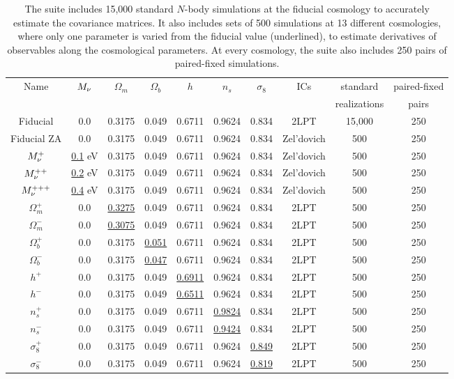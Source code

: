 \begin{table}
\caption{
The \quij suite includes 15,000 standard $N$-body simulations at the fiducial cosmology to 
accurately estimate the covariance matrices. It also includes sets of 500 simulations at 13 
different cosmologies, where only one parameter is varied from the fiducial value (underlined), 
to estimate derivatives of observables along the cosmological parameters. At every cosmology,
the \quij suite also includes 250 pairs of paired-fixed simulations.  
} 
\begin{center}
\begin{tabular}{cccccccccc} \toprule
Name  &$M_\nu$ & $\Omega_m$ & $\Omega_b$ & $h$ & $n_s$ & $\sigma_8$ & ICs & standard & paired-fixed \\
& & & & & & & & realizations & pairs \\[3pt] \hline\hline
Fiducial 	& 0.0         & 0.3175 & 0.049 & 0.6711 & 0.9624 & 0.834 & 2LPT & 15,000 & 250\\ 
Fiducial ZA     & 0.0         & 0.3175 & 0.049 & 0.6711 & 0.9624 & 0.834 & Zel'dovich& 500 & 250\\ 
$M_\nu^+$       & \underline{0.1} eV & 0.3175 & 0.049 & 0.6711 & 0.9624 & 0.834 & Zel'dovich & 500 & 250\\ 
$M_\nu^{++}$    & \underline{0.2} eV & 0.3175 & 0.049 & 0.6711 & 0.9624 & 0.834 & Zel'dovich & 500 & 250\\ 
$M_\nu^{+++}$   & \underline{0.4} eV & 0.3175 & 0.049 & 0.6711 & 0.9624 & 0.834 & Zel'dovich & 500 & 250\\ 
$\Omega_m^+$    & 0.0   & \underline{ 0.3275} & 0.049 & 0.6711 & 0.9624 & 0.834 & 2LPT & 500 & 250\\ 
$\Omega_m^-$    & 0.0   & \underline{ 0.3075} & 0.049 & 0.6711 & 0.9624 & 0.834 & 2LPT & 500 & 250\\ 
$\Omega_b^+$    & 0.0   & 0.3175 & \underline{0.051} & 0.6711 & 0.9624 & 0.834 & 2LPT & 500 & 250\\ 
$\Omega_b^-$    & 0.0   & 0.3175 & \underline{0.047} & 0.6711 & 0.9624 & 0.834 & 2LPT & 500 & 250\\ 
$h^+$           & 0.0   & 0.3175 & 0.049 & \underline{0.6911} & 0.9624 & 0.834 & 2LPT & 500 & 250\\ 
$h^-$           & 0.0   & 0.3175 & 0.049 & \underline{0.6511} & 0.9624 & 0.834 & 2LPT & 500 & 250\\ 
$n_s^+$         & 0.0   & 0.3175 & 0.049 & 0.6711 & \underline{0.9824} & 0.834 & 2LPT & 500 & 250\\ 
$n_s^-$         & 0.0   & 0.3175 & 0.049 & 0.6711 & \underline{0.9424} & 0.834 & 2LPT & 500 & 250\\ 
$\sigma_8^+$    & 0.0   & 0.3175 & 0.049 & 0.6711 & 0.9624 & \underline{0.849} & 2LPT & 500 & 250\\ 
$\sigma_8^-$    & 0.0   & 0.3175 & 0.049 & 0.6711 & 0.9624 & \underline{0.819} & 2LPT & 500 & 250\\[3pt]
\hline
\end{tabular} \label{tab:sims}
\end{center}
\end{table}
